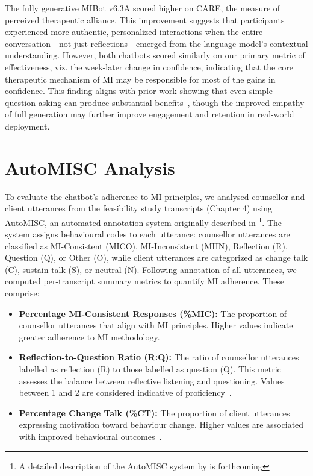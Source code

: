 The fully generative MIBot v6.3A scored higher on CARE, the measure of perceived therapeutic alliance. This improvement suggests that participants experienced more authentic, personalized interactions when the entire conversation---not just reflections---emerged from the language model's contextual understanding. However, both chatbots scored similarly on our primary metric of effectiveness, viz. the week-later change in confidence, indicating that the core therapeutic mechanism of MI may be responsible for most of the gains in confidence. This finding aligns with prior work showing that even simple question-asking can produce substantial benefits~\citep{brown2023mi}, though the improved empathy of full generation may further improve engagement and retention in real-world deployment.

\section{AutoMISC Analysis}
\label{sec:mi-adherence}

To evaluate the chatbot's adherence to MI principles, we analysed counsellor and client utterances from the feasibility study transcripts (Chapter 4) using AutoMISC, an automated annotation system originally described in \citet{mahmood-etal-2025-fully}\footnote{A detailed description of the AutoMISC system by \citet{ali2025automated} is forthcoming}.
The system assigns behavioural codes to each utterance: counsellor utterances are classified as MI-Consistent (MICO), MI-Inconsistent (MIIN), Reflection (R), Question (Q), or Other (O), while client utterances are categorized as change talk (C), sustain talk (S), or neutral (N). Following annotation of all utterances, we computed per-transcript summary metrics to quantify MI adherence. These comprise:

\begin{itemize}

	\item \textbf{Percentage MI-Consistent Responses (\%MIC):} The proportion of counsellor utterances that align with MI principles. Higher values indicate greater adherence to MI methodology.

	\item \textbf{Reflection-to-Question Ratio (R:Q):} The ratio of counsellor utterances labelled as reflection (R) to those labelled as question (Q). This metric assesses the balance between reflective listening and questioning. Values between 1 and 2 are considered indicative of proficiency~\citep{moyers2016miti}.

	\item \textbf{Percentage Change Talk (\%CT):} The proportion of client utterances expressing motivation toward behaviour change. Higher values are associated with improved behavioural outcomes~\citep{Apodaca2009}.

\end{itemize}

